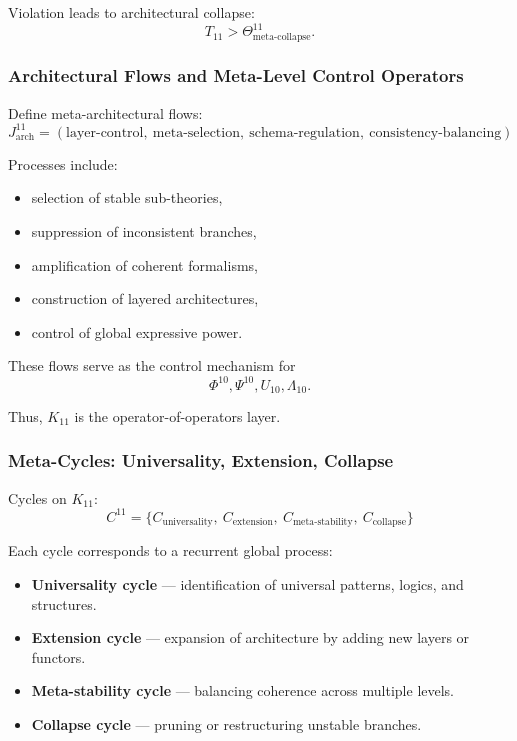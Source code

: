 Violation leads to architectural collapse:
\[
T_{11} > \Theta^{11}_{\text{meta-collapse}}.
\]

\subsubsection{Architectural Flows and Meta-Level Control Operators}

Define meta-architectural flows:
\[
J^{11}_{\text{arch}} = 
(\text{layer-control},\ \text{meta-selection},\ 
 \text{schema-regulation},\ \text{consistency-balancing})
\]

Processes include:
\begin{itemize}
    \item selection of stable sub-theories,
    \item suppression of inconsistent branches,
    \item amplification of coherent formalisms,
    \item construction of layered architectures,
    \item control of global expressive power.
\end{itemize}

These flows serve as the control mechanism for 
\[
\Phi^{10}, \Psi^{10}, U_{10}, \Lambda_{10}.
\]

Thus, $K_{11}$ is the operator-of-operators layer.

\subsubsection{Meta-Cycles: Universality, Extension, Collapse}

Cycles on $K_{11}$:
\[
C^{11} = \{
C_{\text{universality}},\ 
C_{\text{extension}},\ 
C_{\text{meta-stability}},\
C_{\text{collapse}}
\}
\]

Each cycle corresponds to a recurrent global process:

\begin{itemize}
    \item \textbf{Universality cycle}  
      — identification of universal patterns, logics, and structures.

    \item \textbf{Extension cycle}  
      — expansion of architecture by adding new layers or functors.

    \item \textbf{Meta-stability cycle}  
      — balancing coherence across multiple levels.

    \item \textbf{Collapse cycle}  
      — pruning or restructuring unstable branches.
\end{itemize}

